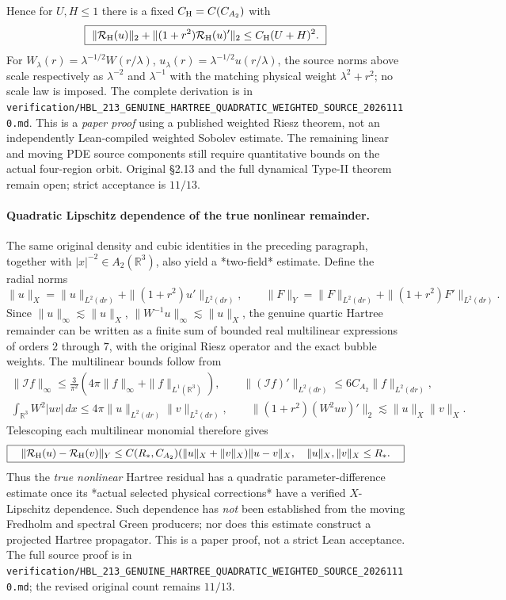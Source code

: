 \documentclass[11pt]{amsart}
\begin{document}
Hence for \(U,H\le1\) there is a fixed
\(C_{\rm H}=C(C_{A_2})\) with
\[
 \boxed{\
  \|\mathcal R_{\rm H}(u)\|_2+
  \|(1+r^2)\mathcal R_{\rm H}(u)'\|_2
  \le C_{\rm H}(U+H)^2.\
 }
\]
For \(W_\lambda(r)=\lambda^{-1/2}W(r/\lambda)\),
\(u_\lambda(r)=\lambda^{-1/2}u(r/\lambda)\),
the source norms above scale respectively as
\(\lambda^{-2}\) and \(\lambda^{-1}\) with the
matching physical weight \(\lambda^2+r^2\);
no scale law is imposed. The complete derivation is
in
\texttt{verification/HBL\_213\_GENUINE\_HARTREE\_QUADRATIC\_WEIGHTED\_SOURCE\_20261110.md}.
This is a \emph{paper proof} using a published weighted
Riesz theorem, not an independently Lean-compiled
weighted Sobolev estimate. The remaining linear
and moving PDE source components still require
quantitative bounds on the actual four-region orbit.
Original §2.13 and the full dynamical Type-II theorem
remain open; strict acceptance is \(11/13\).


\paragraph{Quadratic Lipschitz dependence of the true nonlinear remainder.}
The same original density and cubic identities in the preceding
paragraph, together with \(|x|^{-2}\in A_2(\mathbb R^3)\),
also yield a *two-field* estimate. Define the radial norms
\[
 \|u\|_X=\|u\|_{L^2(dr)}
       +\|(1+r^2)u'\|_{L^2(dr)},\qquad
 \|F\|_Y=\|F\|_{L^2(dr)}
       +\|(1+r^2)F'\|_{L^2(dr)}.
\]
Since \(\|u\|_\infty\lesssim\|u\|_X\),
\(\|W^{-1}u\|_\infty\lesssim\|u\|_X\),
the genuine quartic Hartree remainder can be written as a
finite sum of bounded real multilinear expressions
of orders \(2\) through \(7\), with the original Riesz
operator and the exact bubble weights. The multilinear
bounds follow from
\[
 \begin{gathered}
 \|\mathcal If\|_\infty
 \le\tfrac3{\pi^2}(4\pi\|f\|_\infty+\|f\|_{L^1(\mathbb R^3)}),
 \qquad
 \|(\mathcal If)'\|_{L^2(dr)}
       \le6C_{A_2}\|f\|_{L^2(dr)},\\
 \int_{\mathbb R^3}W^2|u v|\,dx
       \le4\pi\|u\|_{L^2(dr)}\|v\|_{L^2(dr)},\qquad
 \|(1+r^2)(W^2uv)'\|_2
       \lesssim\|u\|_X\|v\|_X.
 \end{gathered}
\]
Telescoping each multilinear monomial therefore gives
\[
 \boxed{\quad
 \|\mathcal R_{\rm H}(u)-\mathcal R_{\rm H}(v)\|_Y
 \le C(R_*,C_{A_2})
       (\|u\|_X+\|v\|_X)\|u-v\|_X,
 \quad
 \|u\|_X,\|v\|_X\le R_* .
 \quad}
\]
Thus the \emph{true nonlinear} Hartree residual has a
quadratic parameter-difference estimate once its
*actual selected physical corrections* have a verified
\(X\)-Lipschitz dependence. Such dependence has
\emph{not} been established from the moving Fredholm
and spectral Green producers; nor does this estimate
construct a projected Hartree propagator. This is a
paper proof, not a strict Lean acceptance. The
full source proof is in
\texttt{verification/HBL\_213\_GENUINE\_HARTREE\_QUADRATIC\_WEIGHTED\_SOURCE\_20261110.md};
the revised original count remains \(11/13\).
\end{document}
